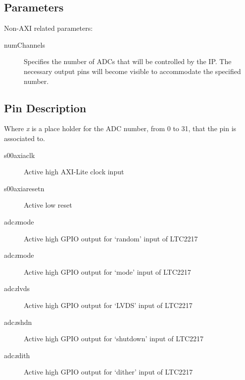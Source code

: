\documentclass[11pt]{article}
\begin{document}
\subsection{Parameters}
Non-AXI related parameters:
\begin{description}
	\item[numChannels]Specifies the number of ADCs that will be controlled by the IP. The necessary output pins will become visible to accommodate the
		specified number.
\end{description}
\subsection{Pin Description}
Where \textit{x} is a place holder for the ADC number, from 0 to 31, that the pin is associated to.
\begin{description}
	\item[s00\textunderscore axi\textunderscore aclk]Active high AXI-Lite clock input
	\item[s00\textunderscore axi\textunderscore aresetn]Active low reset
	\item[adc\textunderscore \textit{x}\textunderscore mode]Active high GPIO output for `random' input of LTC2217
	\item[adc\textunderscore \textit{x}\textunderscore mode]Active high GPIO output for `mode' input of LTC2217
	\item[adc\textunderscore \textit{x}\textunderscore lvds]Active high GPIO output for `LVDS' input of LTC2217
	\item[adc\textunderscore \textit{x}\textunderscore shdn]Active high GPIO output for `shutdown' input of LTC2217
	\item[adc\textunderscore \textit{x}\textunderscore dith]Active high GPIO output for `dither' input of LTC2217
\end{description}
\end{document}
